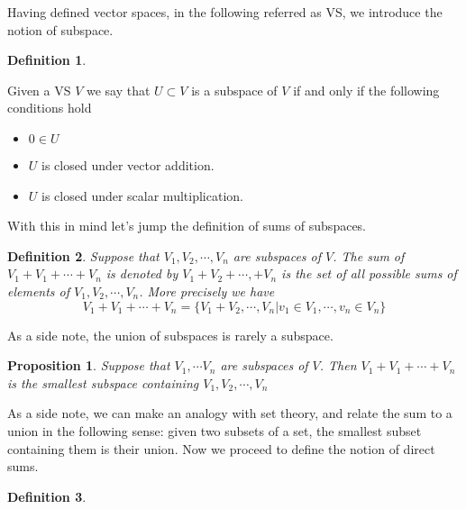 \documentclass{article}
\newtheorem{definition}{Definition}
\newtheorem{proposition}{Proposition}
\begin{document}
Having defined vector spaces, in the following referred as VS, we introduce the notion of subspace.
\begin{definition}
	
\end{definition}
Given a VS $V$ we say that $U\subset V$ is a subspace of $V$ if and only if the following conditions hold
\begin{itemize}
	\item $0\in U$
	\item $U$ is closed under vector addition.
	\item $U$ is closed under scalar multiplication.
\end{itemize}
With this in mind let's jump the definition of sums of subspaces.
\begin{definition}
	Suppose that $V_1, V_2, \cdots, V_n$ are subspaces of $V$. The sum of $V_1 + V_1 + \cdots + V_n$ is denoted by $V_1 + V_2 +\cdots, + V_n$ is the set of all possible sums of elements of $V_1, V_2, \cdots, V_n$. More precisely we have 
		\begin{displaymath}
  			V_1 + V_1 + \cdots + V_n = \{V_1 + V_2, \cdots, V_n | v_1\in V_1,\cdots, v_n\in V_n \}
		\end{displaymath}
\end{definition}
As a side note, the union of subspaces is rarely a subspace.
\begin{proposition}
	Suppose that $V_1,\cdots V_n$ are subspaces of $V$. Then $V_1 + V_1 + \cdots + V_n$ is the smallest subspace containing $V_1, V_2,\cdots ,V_n$
\end{proposition}
As a side note, we can make an analogy with set theory, and relate the sum to a union in the following sense: given two subsets of a set, the smallest subset containing them is their union.
Now we proceed to define the notion of direct sums.
\begin{definition}
	
\end{definition}
	
\end{document}
